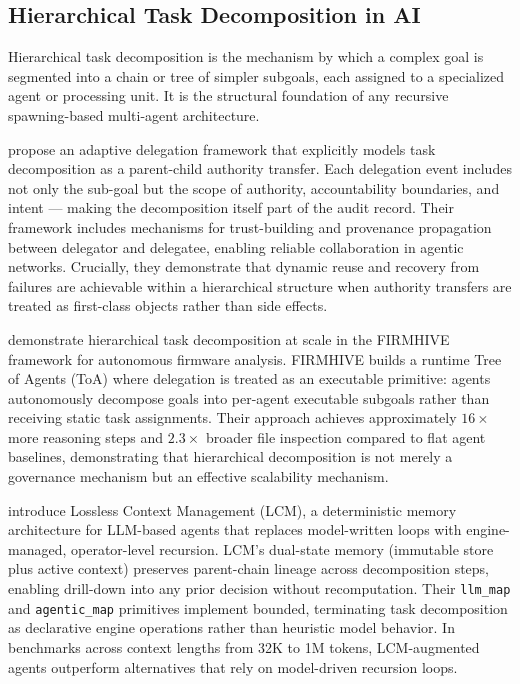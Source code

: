 \subsection{Hierarchical Task Decomposition in AI}

Hierarchical task decomposition is the mechanism by which a complex goal is segmented into a chain or tree of simpler subgoals, each assigned to a specialized agent or processing unit. It is the structural foundation of any recursive spawning-based multi-agent architecture.

 propose an adaptive delegation framework that explicitly models task decomposition as a parent-child authority transfer. Each delegation event includes not only the sub-goal but the scope of authority, accountability boundaries, and intent --- making the decomposition itself part of the audit record. Their framework includes mechanisms for trust-building and provenance propagation between delegator and delegatee, enabling reliable collaboration in agentic networks. Crucially, they demonstrate that dynamic reuse and recovery from failures are achievable within a hierarchical structure when authority transfers are treated as first-class objects rather than side effects.

 demonstrate hierarchical task decomposition at scale in the FIRMHIVE framework for autonomous firmware analysis. FIRMHIVE builds a runtime Tree of Agents (ToA) where delegation is treated as an executable primitive: agents autonomously decompose goals into per-agent executable subgoals rather than receiving static task assignments. Their approach achieves approximately $16\times$ more reasoning steps and $2.3\times$ broader file inspection compared to flat agent baselines, demonstrating that hierarchical decomposition is not merely a governance mechanism but an effective scalability mechanism.

 introduce Lossless Context Management (LCM), a deterministic memory architecture for LLM-based agents that replaces model-written loops with engine-managed, operator-level recursion. LCM's dual-state memory (immutable store plus active context) preserves parent-chain lineage across decomposition steps, enabling drill-down into any prior decision without recomputation. Their \texttt{llm\_map} and \texttt{agentic\_map} primitives implement bounded, terminating task decomposition as declarative engine operations rather than heuristic model behavior. In benchmarks across context lengths from 32K to 1M tokens, LCM-augmented agents outperform alternatives that rely on model-driven recursion loops.

